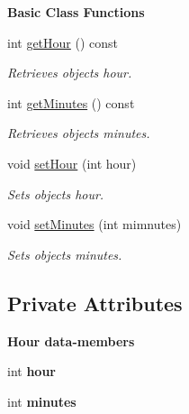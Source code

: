 \begin{Indent}\textbf{ Basic Class Functions}\par
\begin{DoxyCompactItemize}
\item 
int \hyperlink{group___hour_ga44859e9acda4578bc3cfcad5d2f25585}{get\+Hour} () const
\begin{DoxyCompactList}\small\item\em Retrieves object\textquotesingle{}s hour. \end{DoxyCompactList}\item 
int \hyperlink{group___hour_gaccf1de7229b52b59d2119e9802fa3eee}{get\+Minutes} () const
\begin{DoxyCompactList}\small\item\em Retrieves object\textquotesingle{}s minutes. \end{DoxyCompactList}\item 
void \hyperlink{group___hour_ga62d4e3da6eeefecab589a63160493835}{set\+Hour} (int hour)
\begin{DoxyCompactList}\small\item\em Sets object\textquotesingle{}s hour. \end{DoxyCompactList}\item 
void \hyperlink{group___hour_gab3606a7c5dd8679a44e79536a491923e}{set\+Minutes} (int mimnutes)
\begin{DoxyCompactList}\small\item\em Sets object\textquotesingle{}s minutes. \end{DoxyCompactList}\end{DoxyCompactItemize}
\end{Indent}
\subsection*{Private Attributes}
\begin{Indent}\textbf{ Hour data-\/members}\par
\begin{DoxyCompactItemize}
\item 
int {\bfseries hour}
\item 
int {\bfseries minutes}
\end{DoxyCompactItemize}
\end{Indent}
